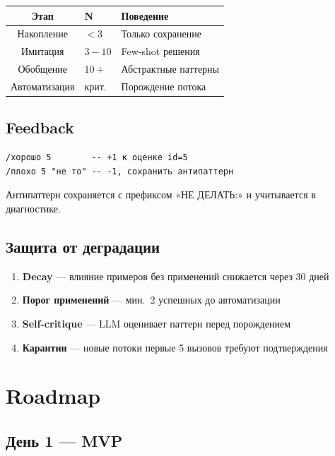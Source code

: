 \documentclass[10pt, oneside]{article}
\begin{document}
\begin{tabular}{@{}cll@{}}
  \toprule
  \textbf{Этап} & \textbf{N} & \textbf{Поведение} \\
  \midrule
  Накопление    & $<3$   & Только сохранение \\
  Имитация      & $3-10$ & Few-shot решения \\
  Обобщение     & $10+$  & Абстрактные паттерны \\
  Автоматизация & крит.  & Порождение потока \\
  \bottomrule
\end{tabular}

\subsection{Feedback}

\begin{lstlisting}[language={},numbers=none]
/хорошо 5        -- +1 к оценке id=5
/плохо 5 "не то" -- -1, сохранить антипаттерн
\end{lstlisting}

Антипаттерн сохраняется с префиксом «НЕ ДЕЛАТЬ:» и учитывается в диагностике.

\subsection{Защита от деградации}

\begin{enumerate}
  \item \textbf{Decay} --- влияние примеров без применений снижается через 30 дней
  \item \textbf{Порог применений} --- мин.~2 успешных до автоматизации
  \item \textbf{Self-critique} --- LLM оценивает паттерн перед порождением
  \item \textbf{Карантин} --- новые потоки первые 5 вызовов требуют подтверждения
\end{enumerate}

\section{Roadmap}

\subsection{День 1 --- MVP}
\end{document}
